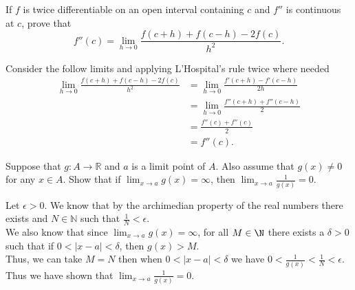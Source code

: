 \documentclass[answers,12pt,addpoints]{exam}
\begin{document}
\begin{questions}
\question If \( f \) is twice differentiable on an open interval containing \( c \) and \( f'' \) is continuous at \( c \), prove that 
\[
f''(c) = \lim_{h \to 0} \frac{f(c + h) + f(c - h) - 2f(c)}{h^2}.
\]
\begin{solution}
Consider the follow limits and applying L'Hospital's rule twice where needed
\begin{align*}
    \lim_{h \to 0} \frac{f(c + h) + f(c - h) - 2f(c)}{h^2} &= \lim_{h \to 0} \frac{f'(c + h) - f'(c-h)}{2h} \\
    &= \lim_{h \to 0} \frac{f''(c + h) + f''(c - h)}{2} \\
    &= \frac{f''(c) + f''(c)}{2} \\
    &= f''(c).
\end{align*}
\end{solution}

\question Suppose that \( g : A \to \mathbb{R} \) and \( a \) is a limit point of \( A \). Also assume that \( g(x) \neq 0 \) for any \( x \in A \). Show that if \( \lim_{x \to a} g(x) = \infty \), then \( \lim_{x \to a} \frac{1}{g(x)} = 0 \).
\begin{solution}
Let $\epsilon > 0$. We know that by the archimedian property of the real numbers there exists and $N \in \mathbb{N}$ such that $\frac{1}{N} < \epsilon$. \\
We also know that since \( \lim_{x \to a} g(x) = \infty \), for all \( M \in \N \) there exists a \( \delta > 0 \) such that if \( 0 < |x - a| < \delta \), then \( g(x) > M \). \\
Thus, we can take \( M = N \) then when $0 < |x - a| < \delta$ we have $0 < \frac{1}{g(x)} < \frac{1}{N} < \epsilon$. \\
Thus we have shown that \( \lim_{x \to a} \frac{1}{g(x)} = 0 \).
\end{solution}

\end{questions}
\end{document}

